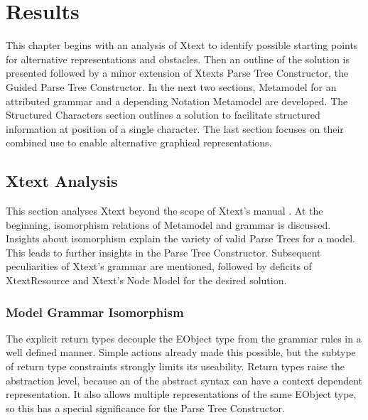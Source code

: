 \chapter{Results}
This chapter begins with an analysis of Xtext to identify possible starting points for alternative representations and obstacles. Then an outline of the solution is presented followed by a minor extension of Xtexts Parse Tree Constructor, the Guided Parse Tree Constructor. In the next two sections, Metamodel for an attributed grammar and a depending Notation Metamodel are developed. The Structured Characters section outlines a solution to facilitate structured information at position of a single character. The last section focuses on their combined use to enable alternative graphical representations.

\section{Xtext Analysis}
This section analyses Xtext beyond the scope of Xtext's manual \cite{XTextMan}. At the beginning, isomorphism relations of Metamodel and grammar is discussed. Insights about isomorphism explain the variety of valid Parse Trees for a model. This leads to further insights in the Parse Tree Constructor. Subsequent peculiarities of Xtext's grammar are mentioned, followed by deficits of XtextResource and Xtext's Node Model for the desired solution.

\subsection{Model Grammar Isomorphism} \label{sec:isomorph}
The explicit return types decouple the EObject type from the grammar rules in a well defined manner. Simple actions already made this possible, but the subtype of return type constraints strongly limits its useability. Return types raise the abstraction level, because an  of the abstract syntax can have a context dependent representation. It also allows multiple representations of the same EObject type, so this has a special significance for the Parse Tree Constructor.

